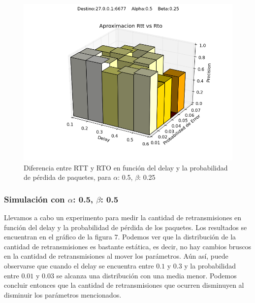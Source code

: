 \begin{figure}[H]
  \centering	
	\includegraphics[scale=0.5]{../analisis/graficos_tablas/graficos_en_funcion_de_delay_probaerror/0.5-0.25_2/rtt_vs_rto.png}
  \caption{Diferencia entre RTT y RTO en funci\'on del delay y la probabilidad de pérdida de paquetes, para $\alpha$: 0.5, $\beta$: 0.25}
	\label{fig:histo-src-sitiotrabajo}
\end{figure}











\subsubsection{Simulación con $\alpha$: 0.5, $\beta$: 0.5}

Llevamos a cabo un experimento para medir la cantidad de retransmisiones en función del delay y la probabilidad de pérdida de los paquetes. Los resultados se encuentran en el gráfico de la figura $7$. Podemos ver que la distribución de la cantidad de retransmisiones es bastante estática, es decir, no hay cambios bruscos en la cantidad de retransmisiones al mover los parámetros. Aún así, puede observarse que cuando el delay se encuentra entre $0.1$ y $0.3$ y la probabilidad entre $0.01$ y $0.03$ se alcanza una distribución con una media menor. Podemos concluir entonces que la cantidad de retransmisiones que ocurren disminuyen al disminuir los parámetros mencionados.

